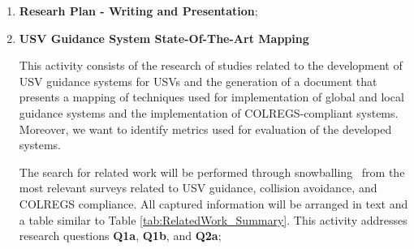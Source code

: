         \begin{enumerate}
            \item \textbf{Researh Plan - Writing and Presentation};
            
            \item \textbf{\ac{USV} Guidance System State-Of-The-Art Mapping} 
            
            This activity consists of the research of studies related to the development of \ac{USV} guidance systems for USVs and the generation of a document that presents a mapping of techniques used for implementation of global and local guidance systems and the implementation of COLREGS-compliant systems. Moreover, we want to identify metrics used for evaluation of the developed systems.
            
            The search for related work will be performed through snowballing~\cite{Wohlin2014Guidelines} from the most relevant surveys related to \ac{USV} guidance, collision avoidance, and \ac{COLREGS} compliance. All captured information will be arranged in text and a table similar to Table \ref{tab:RelatedWork_Summary}. This activity addresses research questions \textbf{Q1a}, \textbf{Q1b}, and \textbf{Q2a};
            
            

\end{enumerate}

